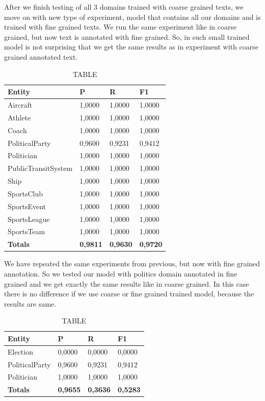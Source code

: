 \documentclass[thesis=M,english]{FITthesis}[2018/05/30]
\begin{document}
	After we finish testing of all 3 domains trained with coarse grained texts, we move on with new type of experiment, model that contains all our domains and is trained with fine grained texts. We run the same experiment like in coarse grained, but now text is annotated with fine grained. So, in such small trained model is not surprising that we get the same results as in experiment with coarse grained annotated text.
	\begin{table}[H]\centering
		\caption{TABLE}
		\label{}
		\begin{tabular}{|l|l|l|l|}
			\hline {\textbf{Entity}} & {\textbf{P}} & {\textbf{R}} & {\textbf{F1}}\\\hline
				Aircraft & 1,0000 & 1,0000 & 1,0000\\
				Athlete & 1,0000 & 1,0000 & 1,0000\\
				Coach & 1,0000 & 1,0000 & 1,0000\\
				PoliticalParty & 0,9600 & 0,9231 & 0,9412\\
				Politician & 1,0000 & 1,0000 & 1,0000\\
				PublicTransitSystem & 1,0000 & 1,0000 & 1,0000\\
				Ship & 1,0000 & 1,0000 & 1,0000\\
				SportsClub & 1,0000 & 1,0000 & 1,0000\\
				SportsEvent & 1,0000 & 1,0000 & 1,0000\\
				SportsLeague & 1,0000 & 1,0000 & 1,0000\\
				SportsTeam & 1,0000 & 1,0000 & 1,0000\\\hline
				\textbf{Totals} & \textbf{0,9811} & \textbf{0,9630} & \textbf{0,9720}\\\hline
		\end{tabular}
	\end{table}

	We have repeated the same experiments from previous, but now with fine grained annotation. So we tested our model with politics domain annotated in fine grained and we get exactly the same results like in coarse grained. In this case there is no difference if we use coarse or fine grained trained model, because the results are same.
	\begin{table}[H]\centering
		\caption{TABLE}
		\label{}
		\begin{tabular}{|l|l|l|l|}
			\hline {\textbf{Entity}} & {\textbf{P}} & {\textbf{R}} & {\textbf{F1}}\\\hline
				Election & 0,0000 & 0,0000 & 0,0000\\
				PoliticalParty & 0,9600 & 0,9231 & 0,9412\\
				Politician & 1,0000 & 1,0000 & 1,0000\\\hline
				\textbf{Totals} & \textbf{0,9655} & \textbf{0,3636} & \textbf{0,5283}\\\hline
		\end{tabular}
	\end{table}	
\end{document}
